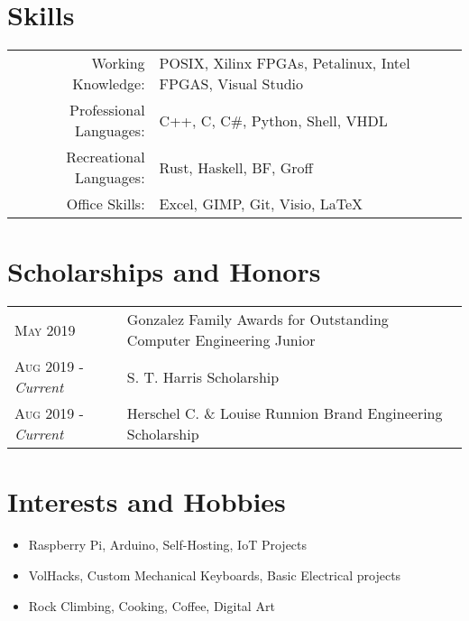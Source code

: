 \documentclass[a4paper,11pt]{article}
\begin{document}
\section{Skills}
\begin{tabularx}{\textwidth}{rl}
   Working Knowledge: & POSIX, Xilinx FPGAs, Petalinux, Intel FPGAS, Visual Studio\\
   Professional Languages: & C++, C, C\#, Python, Shell, VHDL\\
   Recreational Languages: & Rust, Haskell, BF, Groff\\
   Office Skills: & Excel, GIMP, Git, Visio, \LaTeX{}\\
\end{tabularx}

\section{Scholarships and Honors}
\begin{tabularx}{\textwidth}{lX}
   \textsc{May 2019} & Gonzalez Family Awards for Outstanding Computer Engineering Junior\\
   \textsc{Aug 2019} \-- \emph{Current} & S. T. Harris Scholarship\\
   \textsc{Aug 2019} \-- \emph{Current} & Herschel C. \& Louise Runnion Brand Engineering Scholarship\\
\end{tabularx}

\section{Interests and Hobbies}
\begin{itemize}[topsep=1pt,itemsep=0pt,partopsep=1pt, parsep=1pt]
   \item Raspberry Pi, Arduino, Self-Hosting, IoT Projects
   \item VolHacks, Custom Mechanical Keyboards, Basic Electrical projects
   \item Rock Climbing, Cooking, Coffee, Digital Art
\end{itemize}
\end{document}

